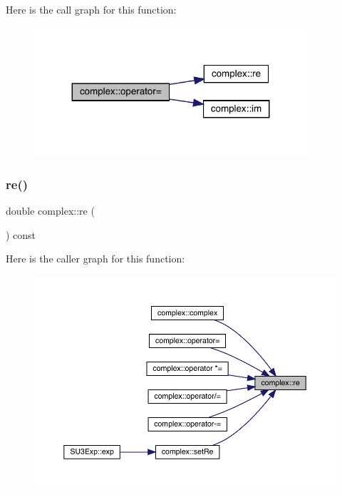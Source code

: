 Here is the call graph for this function\+:\nopagebreak
\begin{figure}[H]
\begin{center}
\leavevmode
\includegraphics[width=287pt]{classcomplex_a83c122535af669e7f331d71de550e9ba_cgraph}
\end{center}
\end{figure}
\mbox{\label{classcomplex_a696019188accc543e7c8297595e297ec}} 
\subsubsection{\texorpdfstring{re()}{re()}}
{\footnotesize\ttfamily double complex\+::re (\begin{DoxyParamCaption}{ }\end{DoxyParamCaption}) const\hspace{0.3cm}{\ttfamily [inline]}}

Here is the caller graph for this function\+:\nopagebreak
\begin{figure}[H]
\begin{center}
\leavevmode
\includegraphics[width=350pt]{classcomplex_a696019188accc543e7c8297595e297ec_icgraph}
\end{center}
\end{figure}
\mbox{\label{classcomplex_aa4c37b87b5b9beebddad476b3049394c}} 
